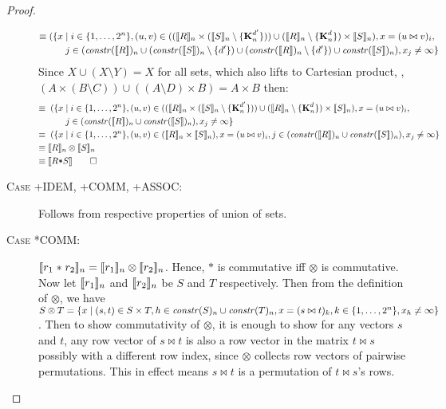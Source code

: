 \begin{proof}
\begin{description}
\begin{align*}
\equiv & \; (\{x \mid i \in \{1, \ldots, 2^n\},
                   (u, v) \in ((\interp{R}_n \times (\interp{S}_n \setminus
         \{\zeroEntry{d'}{n}\})) \cup (\interp{R}_n \setminus
         \{\zeroEntry{d}{n}\}) \times \interp{S}_n),
                   x = (u \bowtie v)_i, \\
 & \qquad         j \in (\effdims{\interp{R}}{n} \cup
         (\effdims{\interp{S}}{n} \setminus \{d'\}) \cup (\effdims{\interp{R}}{n} \setminus
         \{d'\}) \cup \effdims{\interp{S}}{n}),
                   x_j \neq \infty
                  \}
\end{align*}
%
Since $X \cup (X \setminus Y) = X$ for all sets, which also lifts to
Cartesian product, \ie{}, $(A \times (B \setminus C)) \cup ((A \setminus
D) \times B) = A \times B$ then:
%
\begin{align*}
\equiv \; & \; (\{x \mid i \in \{1, \ldots, 2^n\},
                   (u, v) \in ((\interp{R}_n \times (\interp{S}_n \setminus
         \{\zeroEntry{d'}{n}\})) \cup (\interp{R}_n \setminus
         \{\zeroEntry{d}{n}\}) \times \interp{S}_n),
                   x = (u \bowtie v)_i, \\
 & \qquad         j \in (\effdims{\interp{R}}{n} \cup \effdims{\interp{S}}{n}),
                   x_j \neq \infty
                  \} \\
\equiv \; & \; (\{x \mid i \in \{1, \ldots, 2^n\},
                   (u, v) \in (\interp{R}_n \times \interp{S}_n),
                   x = (u \bowtie v)_i, j \in (\effdims{\interp{R}}{n} \cup \effdims{\interp{S}}{n}),
                   x_j \neq \infty
                  \} \\
\equiv \; & \interp{R}_n \otimes \interp{S}_n \\
\equiv \; & \interp{R \term{*} S} \qed
\end{align*}

  \item[\textsc{Case +IDEM, +COMM, +ASSOC}:]
    Follows from respective properties of union of sets.
  \item[\textsc{Case *COMM}:] $\interp{r_1 \; \texttt{$\ast$} \; r_2}_n =
    \interp{r_1}_n \otimes \interp{r_2}_n$. Hence, $\texttt{$\ast$}$ is
    commutative iff $\otimes$ is commutative. Now let $\interp{r_1}_n$ and
    $\interp{r_2}_n$ be $S$ and $T$ respectively. Then from the definition of
    $\otimes$, we have $S \otimes T = \{ x \;|\; (s,t) \in S \times T, 
    h \in \effdims{S}{n} \cup \effdims{T}{n}, x = (s \bowtie t)_k,
    k \in \{ 1, \ldots, 2^n \}, x_h \neq \infty \}$. Then to show commutativity
    of $\otimes$, it is enough to show for any vectors $s$ and $t$, any row
    vector of $s \bowtie t$ is also a row vector in the matrix $t \bowtie s$
    possibly with a different row index, since $\otimes$ collects row vectors of
    pairwise permutations. This in effect means $s \bowtie t$ is a permutation
    of $t \bowtie s$'s rows.


\end{description}
\end{proof}
